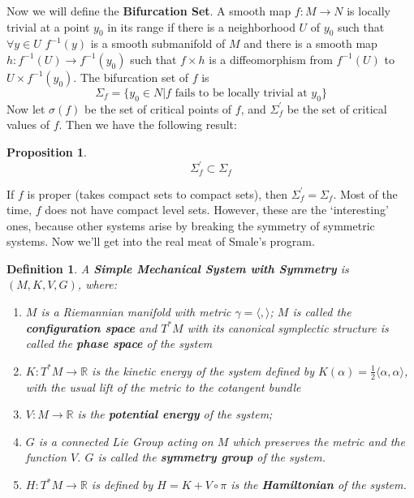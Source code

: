 \documentclass{article}
\newtheorem{defn}{Definition}
\newtheorem{prop}{Proposition}
\begin{document}
Now we will define the \textbf{Bifurcation Set}. A smooth map $f:M \to N$ is locally trivial at a point $y_0$ in its range if there is a neighborhood $U$ of $y_0$ such that $\forall y \in U$ $f^{-1}(y)$ is a smooth submanifold of $M$ and there is a smooth map $h:f^{-1}(U) \to f^{-1}(y_0)$ such that $f \times h$ is a diffeomorphism from $f^{-1}(U)$ to $U \times f^{-1}(y_0)$. The bifurcation set of $f$ is 
\begin{equation}\Sigma_f = \{ y_0 \in N \vert f \text{ fails to be locally trivial at } y_0 \}\end{equation}
Now let $\sigma(f)$ be the set of critical points of $f$, and $\Sigma^{\prime}_f$ be the set of critical values of $f$. Then we have the following result:

\begin{prop}
\begin{equation}\Sigma^{\prime}_f \subset \Sigma_f\end{equation}
\end{prop}

If $f$ is proper (takes compact sets to compact sets), then $\Sigma^{\prime}_f = \Sigma_f$. Most of the time, $f$ does not have compact level sets. However, these are the `interesting' ones, because other systems arise by breaking the symmetry of symmetric systems. Now we'll get into the real meat of Smale's program.

\begin{defn}

A \textbf{Simple Mechanical System with Symmetry} is $(M,K,V,G)$, where:
\begin{enumerate}
    \item $M$ is a Riemannian manifold with metric $\gamma = \langle, \rangle$; $M$ is called the \textbf{configuration space} and $T^*M$ with its canonical symplectic structure is called the \textbf{phase space} of the system
    \item $K:T^*M \to \mathbb{R}$ is the kinetic energy of the system defined by $K(\alpha) = \frac{1}{2}\langle \alpha, \alpha \rangle$, with the usual lift of the metric to the cotangent bundle
    \item $V:M \to \mathbb{R}$ is the \textbf{potential energy} of the system;
    \item $G$ is a connected Lie Group acting on $M$ which preserves the metric and the function $V$. $G$ is called the \textbf{symmetry group} of the system.
    \item $H:T^*M \to \mathbb{R}$ is defined by $H=K + V \circ \pi$ is the \textbf{Hamiltonian} of the system.
\end{enumerate}
\end{defn}
\end{document}
